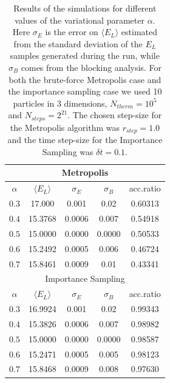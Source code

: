 \begin{table}[H]
    \centering
    \begin{tabular}{ccccc}
    \toprule
        \multicolumn{5}{c}{Metropolis} \\
        \midrule
        $\alpha$ & $\langle E_L \rangle$ & $\sigma_E$ & $\sigma_B$ & acc.ratio \\
         \midrule
        $0.3$ & 17.000 & 0.001 & 0.02 & 0.60313 \\
        $0.4$ & 15.3768 & 0.0006 & 0.007 & 0.54918 \\
        $0.5$ & 15.0000 & 0.0000 & 0.0000 & 0.50533 \\
        $0.6$ & 15.2492 & 0.0005 & 0.006 & 0.46724\\
        $0.7$ & 15.8461 & 0.0009 & 0.01 & 0.43341\\
        \midrule
        \midrule
         \multicolumn{5}{c}{Importance Sampling} \\
        \midrule
        $\alpha$ & $\langle E_L \rangle$ & $\sigma_E$ & $\sigma_B$ & acc.ratio \\
        \midrule
        $0.3$ & 16.9924 & 0.001 & 0.02 & 0.99343\\
        $0.4$ & 15.3826  & 0.0006 & 0.007 & 0.98982\\
        $0.5$ & 15.0000 & 0.0000 & 0.0000 & 0.98587 \\
        $0.6$ & 15.2471 & 0.0005 & 0.005 & 0.98123\\
        $0.7$ & 15.8468 & 0.0009 & 0.008 & 0.97630\\
        \bottomrule
    \end{tabular}
    \caption{Results of the simulations for different values of the variational parameter $\alpha$. Here $\sigma_E$ is the error on $\langle E_L \rangle$ estimated from the standard deviation of the $E_L$ samples generated during the run, while $\sigma_B$ comes from the blocking analysis. For both the brute-force Metropolis case and the importance sampling case we used 10 particles in 3 dimensions, $N_{therm}=10^5$ and $N_{steps}=2^{21}$. The chosen step-size for the Metropolis algorithm was $r_{step}=1.0$ and the time step-size for the Importance Sampling was $\delta t = 0.1$. }
    \label{tab:varying_alpha_noninteracting}
\end{table}


